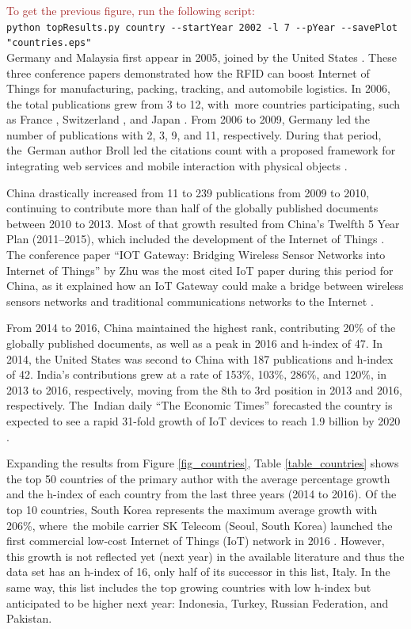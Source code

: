 \documentclass[symmetry,article,accept,moreauthors,pdftex10pt,a4paper]{mdpi}
\begin{document}
\noindent
\textcolor{brown}{To get the previous figure, run the following script:}\\
\hspace*{0.5cm}\verb|python topResults.py country --startYear 2002 -l 7 --pYear --savePlot "countries.eps"|\\

Germany \cite{Bose2005} and Malaysia \cite{Norman2005} first appear in 2005, joined by the United States  \cite{Djassemi2005}. These three conference papers demonstrated how the RFID can boost Internet of Things for manufacturing, packing, tracking, and automobile logistics. In 2006, the total publications grew from 3 to 12, with~more countries participating, such as France \cite{4022056,1698342}, Switzerland \cite{Adelmann2006366,Lehtonen200677}, and Japan \cite{Futatsumori2006258}. From 2006 to 2009, Germany led the number of publications with 2, 3, 9, and 11, respectively. During that period, the~German author Broll led the citations count with a proposed framework for integrating web services and mobile interaction with physical objects \cite{5262929}.

China drastically increased from 11 to 239 publications from 2009 to 2010, continuing to contribute more than half of the globally published documents between 2010 to 2013. Most of that growth resulted from China's Twelfth 5 Year Plan (2011--2015), which included the development of the Internet of Things \cite{ISI:000304905300012}. The conference paper ``IOT Gateway: Bridging Wireless Sensor Networks into Internet of Things'' by Zhu was the most
cited IoT paper during this period for China, as it explained how an IoT Gateway could make a bridge between wireless sensors networks and traditional communications networks to the Internet \cite{Zhu2010347}.

From 2014 to 2016, China maintained the highest rank, contributing 20\% of the globally published documents, as well as a peak in 2016 and h-index of 47. In 2014, the United States was second to China with 187 publications and h-index of 42. India's contributions grew at a rate of 153\%, 103\%, 286\%, and 120\%, in 2013 to 2016, respectively, moving from the 8th to 3rd position in 2013 and 2016, respectively. The~Indian daily ``The Economic Times'' forecasted the country is expected to see a rapid 31-fold growth of IoT devices to reach 1.9 billion by 2020 \cite{theEconomicTimes2017}. 


Expanding the results from Figure \ref{fig_countries}, Table \ref{table_countries} shows the top 50 countries of the primary author with the average percentage growth and the h-index of each country from the last three years (2014 to 2016). Of the top 10 countries, South Korea represents the maximum average growth with 206\%, where~the mobile carrier SK Telecom (Seoul, South Korea) launched the first commercial low-cost Internet of Things (IoT) network in 2016 \cite{bbcKorea2016}. However, this growth is not reflected yet (next year) in the available literature and thus the data set has an h-index of 16, only half of its successor in this list, Italy. In the same way, this list includes the top growing countries with low h-index but anticipated to be higher next year: Indonesia, Turkey, Russian Federation, and Pakistan.
\end{document}

